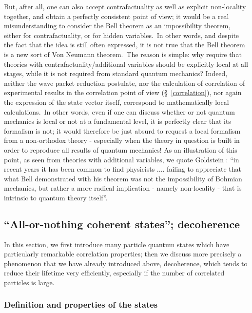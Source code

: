 \documentclass[12pt,onecolumn]{article}%
\begin{document}
But, after all, one can also accept contrafactuality as well as explicit
non-locality together, and obtain a perfectly consistent point of view; it
would be a real misunderstanding to consider the Bell theorem as an
impossibility theorem, either for contrafactuality, or for hidden
variables.\ In other words, and despite the fact that the idea is still often
expressed, it is not true that the Bell theorem is a new sort of Von Neumann
theorem.\ The reason is simple: why require that theories with
contrafactuality/additional variables should be explicitly local at all
stages, while it is not required from standard quantum mechanics? Indeed,
neither the wave packet reduction postulate, nor the calculation of
correlation of experimental results in the correlation point of view
(\S \ \ref{correlation}), nor again the expression of the state vector itself,
correspond to mathematically local calculations.\ In other words, even if one
can discuss whether or not quantum mechanics is local or not at a fundamental
level, it is perfectly clear that its formalism is not; it would therefore be
just absurd to request a local formalism from a non-orthodox theory -
especially when the theory in question is built in order to reproduce all
results of quantum mechanics! As an illustration of this point, as seen from
theories with additional variables, we quote Goldstein \cite{Goldstein}: ``in
recent years it has been common to find physicists .... failing to appreciate
that what Bell demonstrated with his theorem was not the impossibility of
Bohmian mechanics, but rather a more radical implication - namely non-locality
- that is intrinsic to quantum theory itself''.

\subsection{``All-or-nothing coherent states''; decoherence}

In this section, we first introduce many particle quantum states which have
particularly remarkable correlation properties; then we discuss more precisely
a phenomenon that we have already introduced above, decoherence, which tends
to reduce their lifetime very efficiently, especially if the number of
correlated particles is large.

\subsubsection{Definition and properties of the states}
\end{document}
